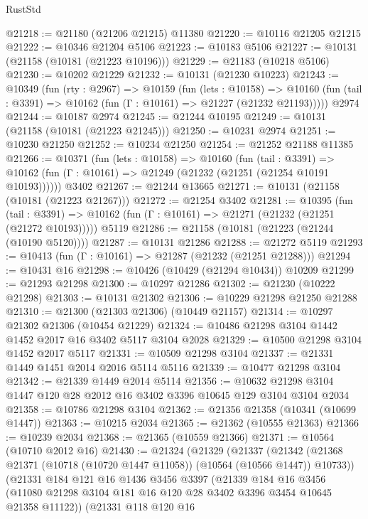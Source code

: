 \begin{lexlean}{RustStd}
\begin{coremodule}
@21218 := @21180 (@21206 @21215) @11380
@21220 := @10116 @21205 @21215
@21222 := @10346 @21204 @5106
@21223 := @10183 @5106
@21227 := @10131 (@21158 (@10181 (@21223 @10196)))
@21229 := @21183 (@10218 @5106)
@21230 := @10202 @21229
@21232 := @10131 (@21230 @10223)
@21243 := @10349
    (fun (rty : @2967) =>
    @10159
      (fun (lets : @10158) =>
      @10160 (fun (tail : @3391) => @10162 (fun (Γ : @10161) => @21227 (@21232 @21193)))))
    @2974
@21244 := @10187 @2974
@21245 := @21244 @10195
@21249 := @10131 (@21158 (@10181 (@21223 @21245)))
@21250 := @10231 @2974
@21251 := @10230 @21250
@21252 := @10234 @21250
@21254 := @21252 @21188 @11385
@21266 := @10371
    (fun (lets : @10158) =>
    @10160
      (fun (tail : @3391) =>
      @10162 (fun (Γ : @10161) => @21249 (@21232 (@21251 (@21254 @10191 @10193))))))
    @3402
@21267 := @21244 @13665
@21271 := @10131 (@21158 (@10181 (@21223 @21267)))
@21272 := @21254 @3402
@21281 := @10395
    (fun (tail : @3391) => @10162 (fun (Γ : @10161) => @21271 (@21232 (@21251 (@21272 @10193)))))
    @5119
@21286 := @21158 (@10181 (@21223 (@21244 (@10190 @5120))))
@21287 := @10131 @21286
@21288 := @21272 @5119
@21293 := @10413 (fun (Γ : @10161) => @21287 (@21232 (@21251 @21288)))
@21294 := @10431 @16
@21298 := @10426 (@10429 (@21294 @10434)) @10209
@21299 := @21293 @21298
@21300 := @10297 @21286
@21302 := @21230 (@10222 @21298)
@21303 := @10131 @21302
@21306 := @10229 @21298 @21250 @21288
@21310 := @21300 (@21303 @21306) (@10449 @21157)
@21314 := @10297 @21302 @21306 (@10454 @21229)
@21324 := @10486 @21298 @3104 @1442 @1452 @2017 @16 @3402 @5117 @3104 @2028
@21329 := @10500 @21298 @3104 @1452 @2017 @5117
@21331 := @10509 @21298 @3104
@21337 := @21331 @1449 @1451 @2014 @2016 @5114 @5116
@21339 := @10477 @21298 @3104
@21342 := @21339 @1449 @2014 @5114
@21356 := @10632 @21298 @3104 @1447 @120 @28 @2012 @16 @3402 @3396 @10645 @129 @3104 @3104 @2034
@21358 := @10786 @21298 @3104
@21362 := @21356 @21358 (@10341 (@10699 @1447))
@21363 := @10215 @2034
@21365 := @21362 (@10555 @21363)
@21366 := @10239 @2034
@21368 := @21365 (@10559 @21366)
@21371 := @10564 (@10710 @2012 @16)
@21430 := @21324
    (@21329
      (@21337
        (@21342 (@21368 @21371 (@10718 (@10720 @1447 @11058)) (@10564 (@10566 @1447)) @10733))
        (@21331
          @184
          @121
          @16
          @1436
          @3456
          @3397
          (@21339
            @184
            @16
            @3456
            (@11080 @21298 @3104 @181 @16 @120 @28 @3402 @3396 @3454 @10645 @21358 @11122))
          (@21331
            @118
            @120
            @16

\end{coremodule}
\end{lexlean}

